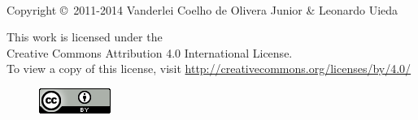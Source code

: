 \thispagestyle{empty}
\clearpage

\\[1cm]
\noindent Copyright \copyright\ 2011-2014
Vanderlei Coelho de Olivera Junior \& Leonardo Uieda
\\[0.5cm]

\begin{center}
This work is licensed under the \\
Creative Commons Attribution 4.0 International License.\\
To view a copy of this license, visit
\url{http://creativecommons.org/licenses/by/4.0/}
\end{center}

\begin{figure}[!h]
    \centering
    \includegraphics[scale=0.8]{figs/cc-by}
\end{figure}
